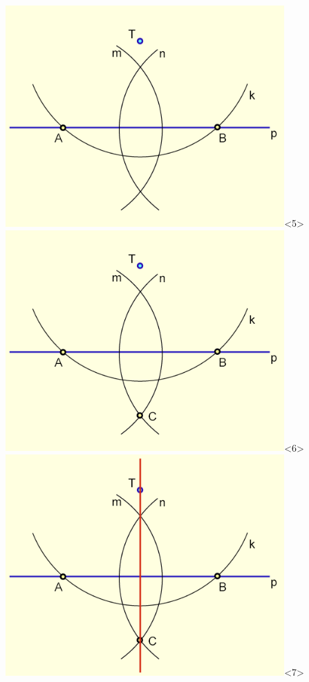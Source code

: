 \documentclass[11pt,hyperref={unicode}]{beamer}
\begin{document}
\begin{frame}
\begin{columns}
\begin{column}{0.5\textwidth}
\begin{center}
            \includegraphics[width=0.8\textwidth,keepaspectratio]{pic5.png}<5>
            \includegraphics[width=0.8\textwidth,keepaspectratio]{pic6.png}<6>
            \includegraphics[width=0.8\textwidth,keepaspectratio]{pic7.png}<7>
         \end{center}
      \end{column}
   \end{columns}
\end{frame} 
\end{document}
